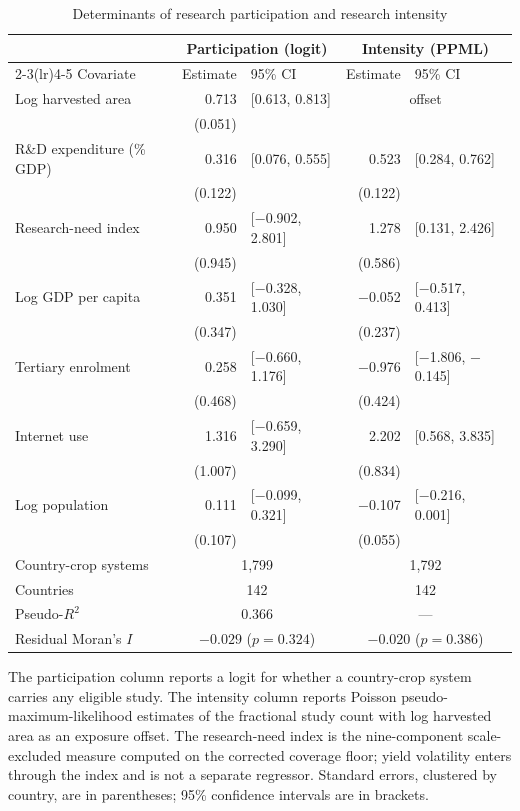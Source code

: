 \documentclass[ASNA,twocolumn]{USG}
\begin{document}
\begin{table}[!t]
\centering
\caption{Determinants of research participation and research intensity}
\label{tab:reg}
\begin{tabular*}{\textwidth}{@{\extracolsep\fill}l r@{\hspace{6pt}}l r@{\hspace{6pt}}l@{}}
\toprule
& \multicolumn{2}{c}{Participation (logit)} & \multicolumn{2}{c}{Intensity (PPML)} \\
\cmidrule(lr){2-3}\cmidrule(lr){4-5}
Covariate & Estimate & 95\% CI & Estimate & 95\% CI \\
\midrule
Log harvested area & 0.713 & [0.613, 0.813] & \multicolumn{2}{c}{offset} \\
 & (0.051) & &  & \\
R\&D expenditure (\% GDP) & 0.316 & [0.076, 0.555] & 0.523 & [0.284, 0.762] \\
 & (0.122) & & (0.122) & \\
Research-need index & 0.950 & [$-$0.902, 2.801] & 1.278 & [0.131, 2.426] \\
 & (0.945) & & (0.586) & \\
Log GDP per capita & 0.351 & [$-$0.328, 1.030] & $-$0.052 & [$-$0.517, 0.413] \\
 & (0.347) & & (0.237) & \\
Tertiary enrolment & 0.258 & [$-$0.660, 1.176] & $-$0.976 & [$-$1.806, $-$0.145] \\
 & (0.468) & & (0.424) & \\
Internet use & 1.316 & [$-$0.659, 3.290] & 2.202 & [0.568, 3.835] \\
 & (1.007) & & (0.834) & \\
Log population & 0.111 & [$-$0.099, 0.321] & $-$0.107 & [$-$0.216, 0.001] \\
 & (0.107) & & (0.055) & \\
\midrule
Country-crop systems & \multicolumn{2}{c}{1,799} & \multicolumn{2}{c}{1,792} \\
Countries & \multicolumn{2}{c}{142} & \multicolumn{2}{c}{142} \\
Pseudo-$R^{2}$ & \multicolumn{2}{c}{0.366} & \multicolumn{2}{c}{---} \\
Residual Moran's $I$ & \multicolumn{2}{c}{$-0.029$ ($p=0.324$)} & \multicolumn{2}{c}{$-0.020$ ($p=0.386$)} \\
\bottomrule
\end{tabular*}
\begin{tablenotes}
\item[] The participation column reports a logit for whether a country-crop system carries any eligible study. The intensity column reports Poisson pseudo-maximum-likelihood estimates of the fractional study count with log harvested area as an exposure offset. The research-need index is the nine-component scale-excluded measure computed on the corrected coverage floor; yield volatility enters through the index and is not a separate regressor. Standard errors, clustered by country, are in parentheses; 95\% confidence intervals are in brackets.
\end{tablenotes}
\end{table}
\end{document}
